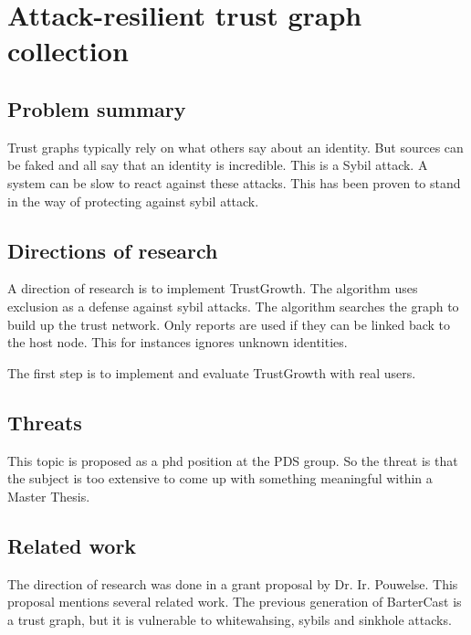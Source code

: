 \section{Attack-resilient trust graph collection}

\subsection*{Problem summary}
Trust graphs typically rely on what others say about an identity.
But sources can be faked and all say that an identity is incredible.
This is a Sybil attack.
A system can be slow to react against these attacks.
This has been proven to stand in the way of protecting against sybil attack.

\subsection*{Directions of research}
A direction of research is to implement TrustGrowth.
The algorithm uses exclusion as a defense against sybil attacks.
The algorithm searches the graph to build up the trust network. 
Only reports are used if they can be linked back to the host node.
This for instances ignores unknown identities.

The first step is to implement and evaluate TrustGrowth with real users.

\subsection*{Threats}
This topic is proposed as a phd position at the PDS group.
So the threat is that the subject is too extensive to come up with something meaningful within a Master Thesis.

\subsection*{Related work}
The direction of research was done in a grant proposal by Dr. Ir. Pouwelse.
This proposal mentions several related work.
The previous generation of BarterCast is a trust graph, but it is vulnerable to whitewahsing, sybils and sinkhole attacks.


